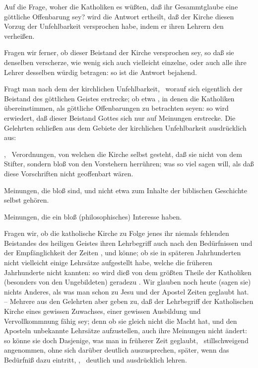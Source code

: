 \begin{aufza}
\item Auf die Frage, woher die Katholiken es wüßten, daß ihr Gesammtglaube eine göttliche Offenbarung sey? wird die Antwort ertheilt, daß  der Kirche diesen Vorzug der Unfehlbarkeit versprochen habe, indem er ihren Lehrern den  verheißen.
\item Fragen wir ferner, ob dieser Beistand der Kirche  versprochen sey, so daß sie denselben  verscherze, wie wenig sich auch vielleicht einzelne, oder auch alle ihre Lehrer desselben würdig betragen: so ist die Antwort bejahend.~
\item Fragt man nach dem  der kirchlichen Unfehlbarkeit, \dh\ worauf sich eigentlich der Beistand des göttlichen Geistes erstrecke; ob etwa , in denen die Katholiken übereinstimmen, als göttliche Offenbarungen zu betrachten seyen: so wird erwiedert, daß dieser Beistand Gottes sich nur auf  Meinungen erstrecke. Die Gelehrten schließen aus dem Gebiete der kirchlichen Unfehlbarkeit ausdrücklich aus:
\begin{aufzb}
\item {}, \dh\ Verordnungen, von welchen die Kirche selbst gesteht, daß sie nicht von dem Stifter, sondern bloß von den Vorstehern herrühren; was so viel sagen will, als daß diese Vorschriften nicht geoffenbart wären.
\item Meinungen, die bloß  sind, und nicht etwa zum Inhalte der biblischen Geschichte selbst gehören.
\item Meinungen, die ein bloß  (philosophisches) Interesse haben.
\end{aufzb}
\item Fragen wir, ob die katholische Kirche zu Folge jenes ihr niemals fehlenden Beistandes des heiligen Geistes ihren Lehrbegriff auch nach den Bedürfnissen und der Empfänglichkeit der Zeiten ,  und  könne; ob sie in späteren Jahrhunderten nicht vielleicht einige Lehrsätze aufgestellt habe, welche die früheren Jahrhunderte nicht kannten: so wird dieß von dem größten Theile der Katholiken (besonders von den Ungebildeten) geradezu . Wir glauben noch heute (sagen sie) nichts Anderes, als was man schon zu Jesu und der Apostel Zeiten geglaubt hat. -- Mehrere aus den Gelehrten aber geben zu, daß der Lehrbegriff der Katholischen Kirche eines gewissen Zuwachses, einer gewissen Ausbildung und Vervollkommnung fähig sey; denn ob sie gleich nicht die Macht hat,  und den Aposteln unbekannte Lehrsätze aufzustellen, auch ihre Meinungen nicht ändert: so könne sie doch Dasjenige, was man in früherer Zeit  geglaubt, \dh\ stillschweigend angenommen, ohne sich darüber deutlich auszusprechen, später, wenn das Bedürfniß dazu eintritt, , \dh\ deutlich und ausdrücklich lehren.~

\end{aufza}
